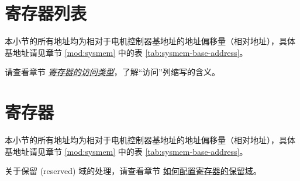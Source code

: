 \documentclass[main\_\_CN.tex]{subfiles}
\begin{document}




\newpage
\hypertarget{mcpwm-reg-summ}{}
\section{寄存器列表}
\label{sec:mcpwm-reg-summ}

本小节的所有地址均为相对于电机控制器基地址的地址偏移量（相对地址），具体基地址请见章节 \ref{mod:sysmem} \textit{} 中的表 \ref{tab:sysmem-base-address}。

请查看章节 \hyperref[glossary-access-types]{\textit{寄存器的访问类型}}，了解“访问”列缩写的含义。






\newpage
\section{寄存器}

本小节的所有地址均为相对于电机控制器基地址的地址偏移量（相对地址），具体基地址请见章节 \ref{mod:sysmem} \textit{} 中的表 \ref{tab:sysmem-base-address}。

关于保留 (reserved) 域的处理，请查看章节 \hyperref[programming-reserved-field]{如何配置寄存器的保留域}。


\end{document}
